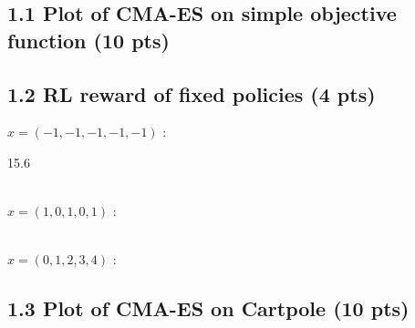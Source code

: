 \documentclass[12pt]{article}
\begin{document}
\subsection*{1.1 Plot of CMA-ES on simple objective function (10 pts)}
\begin{tcolorbox}[fit,height=30em, width=40em, blank, borderline={1pt}{1pt},nobeforeafter]
            \begin{center}
            \begin{solution}

            \end{solution}
            \end{center}
            \end{tcolorbox}
            
\subsection*{1.2 RL reward of fixed policies (4 pts)}

$x = (-1, -1, -1, -1, -1)$ : \begin{tcolorbox}[fit,height=1cm, width=5cm, blank, borderline={1pt}{1pt},nobeforeafter]
    \begin{center}
    \vspace{3mm}
    \large{15.6}
    \end{center}
\end{tcolorbox} \\
$x = (1, 0, 1, 0, 1)$ : \hspace{3.5em} \begin{tcolorbox}[fit,height=1cm, width=5cm, blank, borderline={1pt}{1pt},nobeforeafter]
    \begin{center}
    \vspace{3mm}
    \large{}
    \end{center}
\end{tcolorbox} \\
$x = (0, 1, 2, 3, 4)$ : \hspace{3.5em} \begin{tcolorbox}[fit,height=1cm, width=5cm, blank, borderline={1pt}{1pt},nobeforeafter]
    \begin{center}
    \vspace{3mm}
    \large{}
    \end{center}
\end{tcolorbox}

\subsection*{1.3 Plot of CMA-ES on Cartpole (10 pts)}
\begin{tcolorbox}[fit,height=30em, width=40em, blank, borderline={1pt}{1pt},nobeforeafter]
    \begin{center}
    \begin{solution}

    \end{solution}
    \end{center}
    \end{tcolorbox}
    
\end{document}
